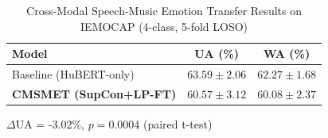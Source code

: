 \begin{table}[h]
\centering
\caption{Cross-Modal Speech-Music Emotion Transfer Results on IEMOCAP (4-class, 5-fold LOSO)}
\label{tab:results}
\begin{tabular}{lcc}
\toprule
Model & UA (\%) & WA (\%) \\
\midrule
Baseline (HuBERT-only) & $63.59 \pm 2.06$ & $62.27 \pm 1.68$ \\
\textbf{CMSMET (SupCon+LP-FT)} & $\mathbf{60.57 \pm 3.12}$ & $\mathbf{60.08 \pm 2.37}$ \\
\bottomrule
\end{tabular}
\vspace{2mm}
\footnotesize{$\Delta$UA = -3.02\%, $p = 0.0004$ (paired t-test)}
\end{table}
